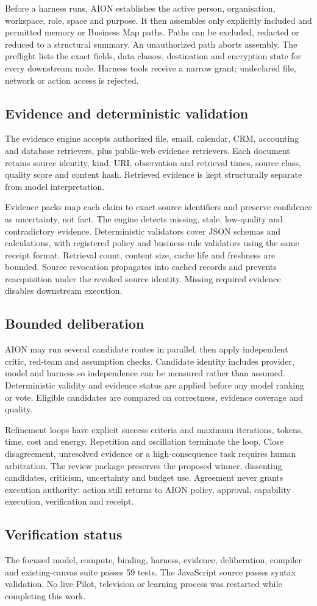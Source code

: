 Before a harness runs, AION establishes the active person, organisation, workspace, role, space and
purpose.  It then assembles only explicitly included and permitted memory or Business Map paths.
Paths can be excluded, redacted or reduced to a structural summary.  An unauthorized path aborts
assembly.  The preflight lists the exact fields, data classes, destination and encryption state for
every downstream node.  Harness tools receive a narrow grant; undeclared file, network or action
access is rejected.

\subsection{Evidence and deterministic validation}

The evidence engine accepts authorized file, email, calendar, CRM, accounting and database
retrievers, plus public-web evidence retrievers.  Each document retains source identity, kind, URI,
observation and retrieval times, source class, quality score and content hash.  Retrieved evidence is
kept structurally separate from model interpretation.

Evidence packs map each claim to exact source identifiers and preserve confidence as uncertainty,
not fact.  The engine detects missing, stale, low-quality and contradictory evidence.  Deterministic
validators cover JSON schemas and calculations, with registered policy and business-rule validators
using the same receipt format.  Retrieval count, content size, cache life and freshness are bounded.
Source revocation propagates into cached records and prevents reacquisition under the revoked source
identity.  Missing required evidence disables downstream execution.

\subsection{Bounded deliberation}

AION may run several candidate routes in parallel, then apply independent critic, red-team and
assumption checks.  Candidate identity includes provider, model and harness so independence can be
measured rather than assumed.  Deterministic validity and evidence status are applied before any
model ranking or vote.  Eligible candidates are compared on correctness, evidence coverage and
quality.

Refinement loops have explicit success criteria and maximum iterations, tokens, time, cost and
energy.  Repetition and oscillation terminate the loop.  Close disagreement, unresolved evidence
or a high-consequence task requires human arbitration.  The review package preserves the proposed
winner, dissenting candidates, criticism, uncertainty and budget use.  Agreement never grants
execution authority: action still returns to AION policy, approval, capability execution,
verification and receipt.

\subsection{Verification status}

The focused model, compute, binding, harness, evidence, deliberation, compiler and existing-canvas
suite passes 59 tests.  The JavaScript source passes syntax validation.  No live Pilot, television or
learning process was restarted while completing this work.
